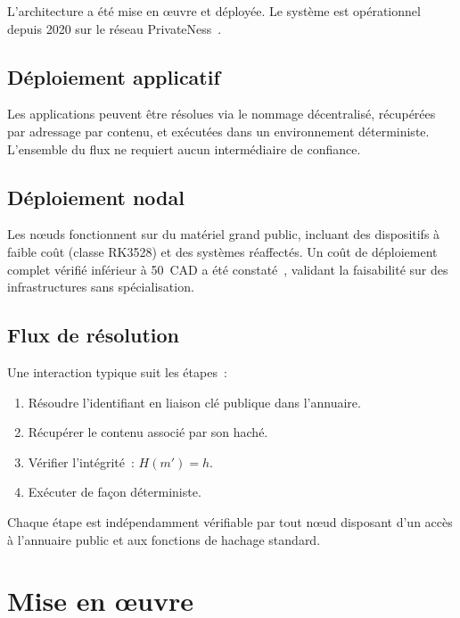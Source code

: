 \documentclass[11pt,a4paper]{article}
\begin{document}
L'architecture a été mise en œuvre et déployée.  Le système est opérationnel
depuis 2020 sur le réseau PrivateNess~\cite{onchain}.

\subsection{Déploiement applicatif}

Les applications peuvent être résolues via le nommage décentralisé,
récupérées par adressage par contenu, et exécutées dans un environnement
déterministe.  L'ensemble du flux ne requiert aucun intermédiaire de confiance.

\subsection{Déploiement nodal}

Les nœuds fonctionnent sur du matériel grand public, incluant des dispositifs
à faible coût (classe RK3528) et des systèmes réaffectés.  Un coût de
déploiement complet vérifié inférieur à 50~CAD a été constaté~\cite{onchain},
validant la faisabilité sur des infrastructures sans spécialisation.

\subsection{Flux de résolution}

Une interaction typique suit les étapes~:

\begin{enumerate}[leftmargin=*]
  \item Résoudre l'identifiant en liaison clé publique dans l'annuaire.
  \item Récupérer le contenu associé par son haché.
  \item Vérifier l'intégrité~: $H(m') = h$.
  \item Exécuter de façon déterministe.
\end{enumerate}

Chaque étape est indépendamment vérifiable par tout nœud disposant d'un
accès à l'annuaire public et aux fonctions de hachage standard.

\section{Mise en œuvre}
\end{document}

